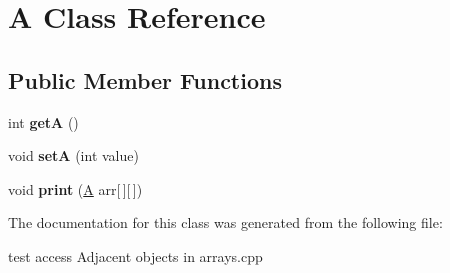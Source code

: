 \hypertarget{class_a}{}\section{A Class Reference}
\label{class_a}
\subsection*{Public Member Functions}
\begin{DoxyCompactItemize}
\item 
\hypertarget{class_a_acbc06916a628548a382847da3daccd96}{}int {\bfseries get\+A} ()\label{class_a_acbc06916a628548a382847da3daccd96}

\item 
\hypertarget{class_a_adebb7e08d7f818a60d59d184e3272c24}{}void {\bfseries set\+A} (int value)\label{class_a_adebb7e08d7f818a60d59d184e3272c24}

\item 
\hypertarget{class_a_a2e7871019cdb883ecb1201929718b0c3}{}void {\bfseries print} (\hyperlink{class_a}{A} arr\mbox{[}$\,$\mbox{]}\mbox{[}$\,$\mbox{]})\label{class_a_a2e7871019cdb883ecb1201929718b0c3}

\end{DoxyCompactItemize}


The documentation for this class was generated from the following file\+:\begin{DoxyCompactItemize}
\item 
test access Adjacent objects in arrays.\+cpp\end{DoxyCompactItemize}
